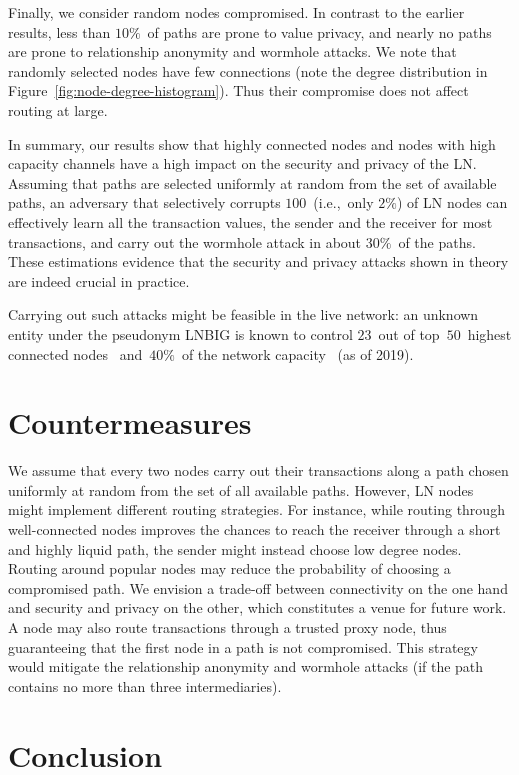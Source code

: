 Finally, we consider random nodes compromised.
In contrast to the earlier results, less than $10\%$~of paths are prone to value privacy, and nearly no paths are prone to relationship anonymity and wormhole attacks.
We note that randomly selected nodes have few connections (note the degree distribution in Figure~\ref{fig:node-degree-histogram}).
Thus their compromise does not affect routing at large.

In summary, our results show that highly connected nodes and nodes with high capacity channels have a high impact on the security and privacy of the LN\@.
Assuming that paths are selected uniformly at random from the set of available paths, an adversary that selectively corrupts $100$~(i.e.,~only $2\%$) of LN nodes can effectively learn all the transaction values, the sender and the receiver for most transactions, and carry out the wormhole attack in about $30\%$~of the paths.
These estimations evidence that the security and privacy attacks shown in theory are indeed crucial in practice.

Carrying out such attacks might be feasible in the live network: an unknown entity under the pseudonym LNBIG is known to control $23$~out of top~$50$~highest connected nodes~\cite{1MLTopConnected} and~$40\%$~of the network capacity~\cite{TheBlockLNBIG} (as of 2019).


\section{Countermeasures}
We assume that every two nodes carry out their transactions along a path chosen uniformly at random from the set of all available paths.
However, LN nodes might implement different routing strategies.
For instance, while routing through well-connected nodes improves the chances to reach the receiver through a short and highly liquid path, the sender might instead choose low degree nodes.
Routing around popular nodes may reduce the probability of choosing a compromised path.
We envision a trade-off between connectivity on the one hand and security and privacy on the other, which constitutes a venue for future work.
A node may also route transactions through a trusted proxy node, thus guaranteeing that the first node in a path is not compromised.
This strategy would mitigate the relationship anonymity and wormhole attacks (if the path contains no more than three intermediaries).


\section{Conclusion}
\label{sec:conclusions}

